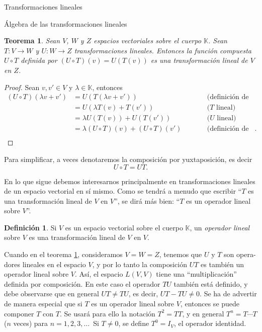\documentclass[a4paper,12pt,twoside,spanish]{amsbook}
\newtheorem{teorema}{Teorema}[section]
\theoremstyle{definition}
\newtheorem{definicion}{Definici\'on}[section]
\theoremstyle{remark}
\newcommand{\K}{\mathbb K}
\begin{document}
\begin{chapter}{Transformaciones lineales}
\begin{section}{Álgebra de las transformaciones lineales}
		\begin{teorema}\label{th-6-hoffman}
			Sean $V$, $W$ y $Z$ espacios vectoriales sobre el cuerpo $\K$.  Sean $T: V \to W$ y $U: W \to Z$ 
			transformaciones lineales. Entonces la función compuesta $U\circ T$ definida por $(U\circ T)(v) = U(T(v))$ es una transformación lineal de $V$ en $Z$.
		\end{teorema} 
		\begin{proof} Sean $v, v' \in V$ y $\lambda \in \K$, entonces
			\begin{equation*}
			\begin{array}{rlll}
				(U\circ T)(\lambda v + v') &= U(T(\lambda v + v'))&\qquad&\text{(definición de composición)} \\
				 &= U(\lambda T( v) + T(v'))&\qquad&\text{($T$ lineal)} \\
				 &= \lambda U(T( v)) + U(T(v'))&\qquad&\text{($U$ lineal)} \\
				 &= \lambda (U\circ T)( v) + (U\circ T)(v')&\qquad&\text{(definición de composición)}. \\
			\end{array}
			\end{equation*}
			
		\end{proof}
		
		Para simplificar, a veces  denotaremos la composición por yuxtaposición,  es decir $$U\circ T = U T.$$
		
		
		En lo que sigue debemos interesarnos principalmente en transformaciones lineales de un espacio vectorial en sí mismo. Como se tendrá a menudo que 	escribir ``$T$ es una transformación lineal de $V$ en $V$'', se dirá más bien: ``$T$ es un operador lineal sobre $V$''. 
		
		\begin{definicion}
			Si $V$ es un espacio vectorial sobre el cuerpo $\K$, un \textit{operador lineal} sobre $V$ es una transformación lineal de $V$ en $V$.
		\end{definicion}
		
		Cuando  en el teorema \ref{th-6-hoffman}, consideramos $V = W = Z$, tenemos que $U$ y $T$ son opera-
		dores lineales en el espacio $V$, y por lo tanto la composición $UT$ es también un operador lineal sobre $V$. Así, el espacio $L(V, V)$ tiene una ``multiplicación'' definida por composición. En este caso el operador $TU$ también está definido, y debe observarse que en general $UT \not= TU$, es decir, $UT - TU \not= 0$. Se ha de advertir de manera especial que si $T$ es un operador lineal sobre $V$, entonces se puede componer $T$ con $T$. Se usará para ello la notación $T^2 = TT$, y en general $T^n = T \cdots T$ ($n$ veces) para $n = 1, 2, 3, \ldots$\,  Si $T \ne 0$, se define $T^0 = I_V$, el operador identidad.
			

\end{section}
\end{chapter}
\end{document}
